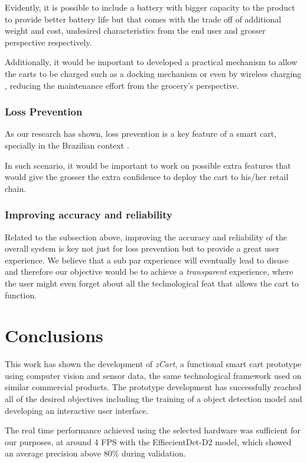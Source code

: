 \documentclass[openright]{normas-utf-tex} %
\begin{document}
Evidently, it is possible to include a battery with bigger capacity to the
product to provide better battery life but that comes with the trade off of
additional weight and cost, undesired characteristics from the end user and
grosser perspective respectively.

Additionally, it would be important to developed a practical mechanism to allow
the carts to be charged such as a docking mechanism or even by wireless
charging \cite{Treffers2015}, reducing the maintenance effort from the grocery's
perspective. 

\subsection{Loss Prevention}

As our research has shown, loss prevention is a key feature of a smart cart, specially in the Brazilian context
\cite{Nextop2022}.

In such scenario, it would be important to work on possible extra features that
would give the grosser the extra confidence to deploy the cart to his/her retail
chain.

\subsection{Improving accuracy and reliability}

Related to the subsection above, improving the accuracy and reliability of the
overall system is key not just for loss prevention but to provide a great user
experience. We believe that a sub par experience will eventually lead to disuse
and therefore our objective would be to achieve a \textit{transparent}
experience, where the user might even forget about all the technological feat
that allows the cart to function.

\chapter{Conclusions}

This work has shown the development of \textit{zCart}, a functional smart cart
prototype using computer vision and sensor data, the same technological
framework used on similar commercial products. The prototype development has
successfully reached all of the desired objectives including the training of a
object detection model and developing an interactive user interface.

The real time performance achieved using the selected hardware was sufficient
for our purposes, at around 4 FPS with the EffiecientDet-D2 model, which showed an
average precision above 80\% during validation.
\end{document}
